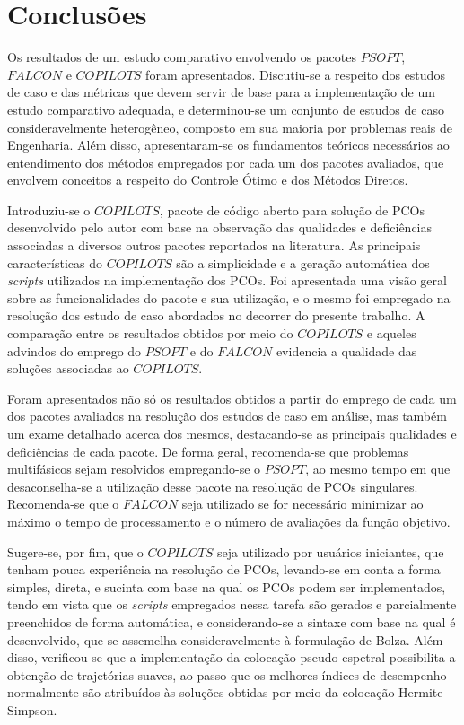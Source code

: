\section{Conclusões}

Os resultados de um estudo comparativo envolvendo os pacotes $ PSOPT $, $ FALCON $ e $ COPILOTS $ foram apresentados. Discutiu-se a respeito dos estudos de caso e das métricas que devem servir de base para a implementação de um estudo comparativo adequada, e determinou-se um conjunto de estudos de caso consideravelmente heterogêneo, composto em sua maioria por problemas reais de Engenharia. Além disso, apresentaram-se os fundamentos teóricos necessários ao entendimento dos métodos empregados por cada um dos pacotes avaliados, que envolvem conceitos a respeito do Controle Ótimo e dos Métodos Diretos. 

Introduziu-se o $ COPILOTS $, pacote de código aberto para solução de PCOs desenvolvido pelo autor com base na observação das qualidades e deficiências associadas a diversos outros pacotes reportados na literatura. As principais características do $ COPILOTS $ são a simplicidade e a geração automática dos \textit{scripts} utilizados na implementação dos PCOs. Foi apresentada uma visão geral sobre as funcionalidades do pacote e sua utilização, e o mesmo foi empregado na resolução dos estudo de caso abordados no decorrer do presente trabalho. A comparação entre os resultados obtidos por meio do $ COPILOTS $ e aqueles advindos do emprego do $ PSOPT $ e do $ FALCON $ evidencia a qualidade das soluções associadas ao $ COPILOTS $.
 
Foram apresentados não só os resultados obtidos a partir do emprego de cada um dos pacotes avaliados na resolução dos estudos de caso em análise, mas também um exame detalhado acerca dos mesmos, destacando-se as principais qualidades e deficiências de cada pacote. De forma geral, recomenda-se que problemas multifásicos sejam resolvidos empregando-se o $ PSOPT $, ao mesmo tempo em que desaconselha-se a utilização desse pacote na resolução de PCOs singulares. Recomenda-se que o $ FALCON $ seja utilizado se for necessário minimizar ao máximo o tempo de processamento e o número de avaliações da função objetivo. 

Sugere-se, por fim, que o $ COPILOTS $ seja utilizado por usuários iniciantes, que tenham pouca experiência na resolução de PCOs, levando-se em conta a forma simples, direta, e sucinta com base na qual os PCOs podem ser implementados, tendo em vista que os \textit{scripts} empregados nessa tarefa são gerados e parcialmente preenchidos de forma automática, e considerando-se a sintaxe com base na qual é desenvolvido, que se assemelha consideravelmente à formulação de Bolza. Além disso, verificou-se que a implementação da colocação pseudo-espetral possibilita a obtenção de trajetórias suaves, ao passo que os melhores índices de desempenho normalmente são atribuídos às soluções obtidas por meio da colocação Hermite-Simpson. 

